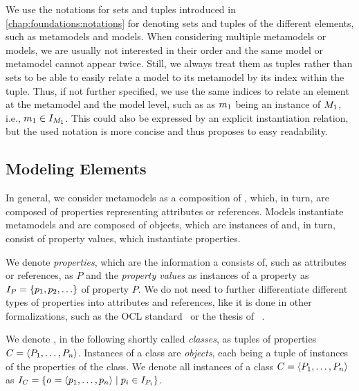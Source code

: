 We use the notations for sets and tuples introduced in \autoref{chap:foundations:notations} for denoting sets and tuples of the different elements, such as metamodels and models.
When considering multiple metamodels or models, we are usually not interested in their order and the same model or metamodel cannot appear twice.
Still, we always treat them as tuples rather than sets to be able to easily relate a model to its metamodel by its index within the tuple.
Thus, if not further specified, we use the same indices to relate an element at the metamodel and the model level, such as as $\model{m}{1}$ being an instance of $\metamodel{M}{1}$, i.e., $\model{m}{1} \in \metamodelinstanceset{M}{1}$.
This could also be expressed by an explicit instantiation relation, but the used notation is more concise and thus proposes to easy readability.


\subsection{Modeling Elements}

In general, we consider metamodels as a composition of \metaclasses, which, in turn, are composed of properties representing attributes or references.
Models instantiate metamodels and are composed of objects, which are instances of \metaclasses and, in turn, consist of property values, which instantiate properties.

We denote \emph{properties}, which are the information a \metaclass consists of, such as attributes or references, as $P$ and the \emph{property values} as instances of a property as $\instances{P} = \setted{p_1, p_2, \dots}$ of property $P$. 
We do not need to further differentiate different types of properties into attributes and references, like it is done in other formalizations, such as the \gls{OCL} standard~\cite[A.1]{ocl} or the thesis of \citeauthor{kramer2017a}~\cite[2.3.2]{kramer2017a}.

We denote \emph{\metaclasses}, in the following shortly called \emph{classes}, as tuples of properties $\class{C}{} = \tupled{P_1, \dots, P_n}$. 
Instances of a class are \emph{objects}, each being a tuple of instances of the properties of the class.
We denote all instances of a class $\class{C}{} = \tupled{P_1, \dots, P_n}$ as $\instances{\class{C}{}} = \setted{\object{o}{} = \tupled{p_1, \dots, p_n} \mid p_i \in \instances{P_i}}$.

